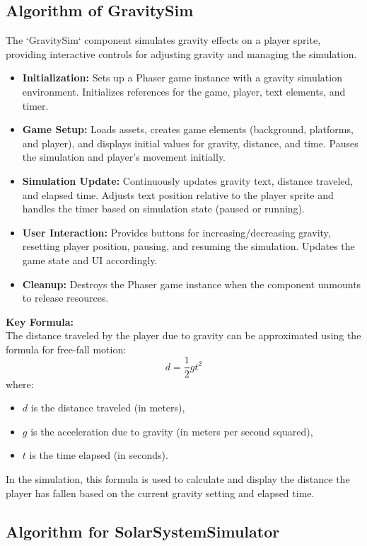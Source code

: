 \subsection{Algorithm of GravitySim}
The `GravitySim` component simulates gravity effects on a player sprite, providing interactive controls for adjusting gravity and managing the simulation.
\begin{itemize}
    \item \textbf{Initialization:} Sets up a Phaser game instance with a gravity simulation environment. Initializes references for the game, player, text elements, and timer.
    \item \textbf{Game Setup:} Loads assets, creates game elements (background, platforms, and player), and displays initial values for gravity, distance, and time. Pauses the simulation and player's movement initially.
    \item \textbf{Simulation Update:} Continuously updates gravity text, distance traveled, and elapsed time. Adjusts text position relative to the player sprite and handles the timer based on simulation state (paused or running).
    \item \textbf{User Interaction:} Provides buttons for increasing/decreasing gravity, resetting player position, pausing, and resuming the simulation. Updates the game state and UI accordingly.
    \item \textbf{Cleanup:} Destroys the Phaser game instance when the component unmounts to release resources.
\end{itemize}
\textbf{Key Formula:}\\
The distance traveled by the player due to gravity can be approximated using the formula for free-fall motion:
\begin{equation}
    d = \frac{1}{2} g t^2
\end{equation}
where:
\begin{itemize}
    \item \(d\) is the distance traveled (in meters),
    \item \(g\) is the acceleration due to gravity (in meters per second squared),
    \item \(t\) is the time elapsed (in seconds).
\end{itemize}
In the simulation, this formula is used to calculate and display the distance the player has fallen based on the current gravity setting and elapsed time.
\subsection{Algorithm for SolarSystemSimulator}

